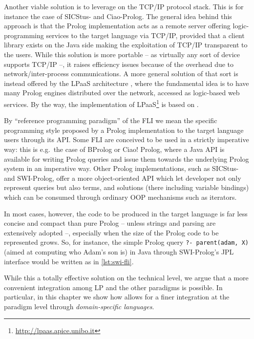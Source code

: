 \documentclass[12pt,a4paper,openright,twoside]{book}
\begin{document}
Another viable solution is to leverage on the TCP/IP protocol stack.
%
This is for instance the case of SICStus- and Ciao-Prolog.
%
The general idea behind this approach is that the Prolog implementation acts as a remote server offering logic-programming services to the target language via TCP/IP, provided that a client library exists on the Java side making the exploitation of TCP/IP transparent to the users.
%
While this solution is more portable -- as virtually any sort of device supports TCP/IP --, it raises efficiency issues because of the overhead due to network/inter-process communications.
%
A more general solution of that sort is instead offered by the LPaaS architecture \cite{lpaas-tplp18}, where the fundamental idea is to have many Prolog engines distributed over the network, accessed as logic-based web services.
%
By the way, the implementation of LPaaS\footnote{\url{http://lpaas.apice.unibo.it}} is based on \tuprolog{}.

By ``reference programming paradigm'' of the FLI we mean the specific programming style proposed by a Prolog implementation to the target language users through its API.
%
Some FLI are conceived to be used in a strictly imperative way: this is e.g.\ the case of BProlog or Ciao! Prolog, where a Java API is available for writing Prolog queries and issue them towards the underlying Prolog system in an imperative way.
%
Other Prolog implementations, such as SICStus- and SWI-Prolog, offer a more object-oriented API which let developer not only represent queries but also terms, and solutions (there including variable bindings) which can be consumed through ordinary OOP mechanisms such as iterators.

In most cases, however, the code to be produced in the target language is far less concise and compact than pure Prolog -- unless strings and parsing are extensively adopted  --, especially when the size of the Prolog code to be represented grows.
%
So, for instance, the simple Prolog query \mbox{\texttt{?- parent(adam, X)}} (aimed at computing who Adam's son is) in Java through SWI-Prolog's JPL interface would be written as in \cref{lst:swi-fli}.
%

%
While this a totally effective solution on the technical level, we argue that a more convenient integration among LP and the other paradigms is possible.
%
In particular, in this chapter we show how \twopkt{} allows for a finer integration at the paradigm level through \emph{domain-specific languages}.
\end{document}
